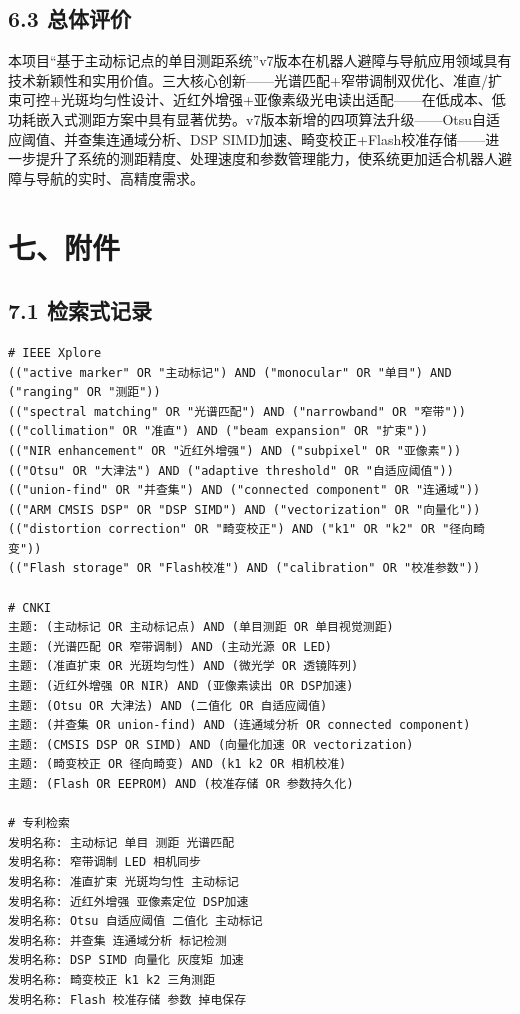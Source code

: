 \documentclass[12pt,a4paper]{article}
\begin{document}
\subsection{6.3 总体评价}

本项目``基于主动标记点的单目测距系统''v7版本在机器人避障与导航应用领域具有技术新颖性和实用价值。三大核心创新——光谱匹配+窄带调制双优化、准直/扩束可控+光斑均匀性设计、近红外增强+亚像素级光电读出适配——在低成本、低功耗嵌入式测距方案中具有显著优势。v7版本新增的四项算法升级——Otsu自适应阈值、并查集连通域分析、DSP SIMD加速、畸变校正+Flash校准存储——进一步提升了系统的测距精度、处理速度和参数管理能力，使系统更加适合机器人避障与导航的实时、高精度需求。

\newpage

\section{七、附件}

\subsection{7.1 检索式记录}

\begin{verbatim}
# IEEE Xplore
(("active marker" OR "主动标记") AND ("monocular" OR "单目") AND ("ranging" OR "测距"))
(("spectral matching" OR "光谱匹配") AND ("narrowband" OR "窄带"))
(("collimation" OR "准直") AND ("beam expansion" OR "扩束"))
(("NIR enhancement" OR "近红外增强") AND ("subpixel" OR "亚像素"))
(("Otsu" OR "大津法") AND ("adaptive threshold" OR "自适应阈值"))
(("union-find" OR "并查集") AND ("connected component" OR "连通域"))
(("ARM CMSIS DSP" OR "DSP SIMD") AND ("vectorization" OR "向量化"))
(("distortion correction" OR "畸变校正") AND ("k1" OR "k2" OR "径向畸变"))
(("Flash storage" OR "Flash校准") AND ("calibration" OR "校准参数"))

# CNKI
主题: (主动标记 OR 主动标记点) AND (单目测距 OR 单目视觉测距)
主题: (光谱匹配 OR 窄带调制) AND (主动光源 OR LED)
主题: (准直扩束 OR 光斑均匀性) AND (微光学 OR 透镜阵列)
主题: (近红外增强 OR NIR) AND (亚像素读出 OR DSP加速)
主题: (Otsu OR 大津法) AND (二值化 OR 自适应阈值)
主题: (并查集 OR union-find) AND (连通域分析 OR connected component)
主题: (CMSIS DSP OR SIMD) AND (向量化加速 OR vectorization)
主题: (畸变校正 OR 径向畸变) AND (k1 k2 OR 相机校准)
主题: (Flash OR EEPROM) AND (校准存储 OR 参数持久化)

# 专利检索
发明名称: 主动标记 单目 测距 光谱匹配
发明名称: 窄带调制 LED 相机同步
发明名称: 准直扩束 光斑均匀性 主动标记
发明名称: 近红外增强 亚像素定位 DSP加速
发明名称: Otsu 自适应阈值 二值化 主动标记
发明名称: 并查集 连通域分析 标记检测
发明名称: DSP SIMD 向量化 灰度矩 加速
发明名称: 畸变校正 k1 k2 三角测距
发明名称: Flash 校准存储 参数 掉电保存
\end{verbatim}
\end{document}
